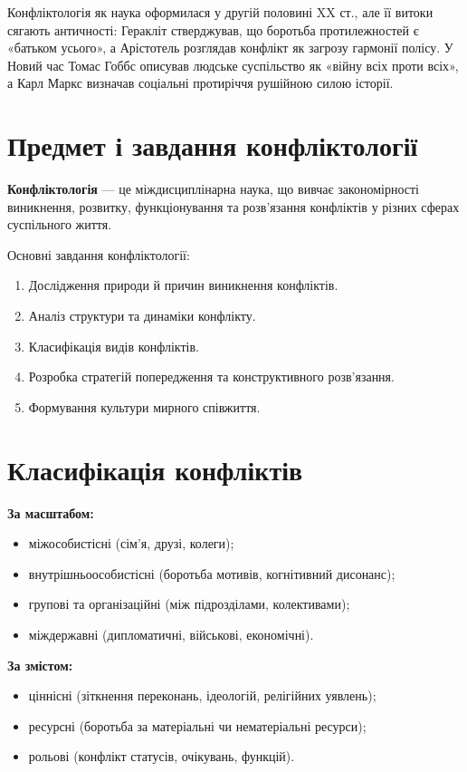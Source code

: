 \documentclass[12pt,a4paper]{article}
\begin{document}
    Конфліктологія як наука оформилася у другій половині XX ст., 
    але її витоки сягають античності: Геракліт стверджував, що боротьба протилежностей 
    є «батьком усього», а Арістотель розглядав конфлікт як загрозу гармонії полісу. 
    У Новий час Томас Гоббс описував людське суспільство як «війну всіх проти всіх», 
    а Карл Маркс визначав соціальні протиріччя рушійною силою історії.  

    \section*{Предмет і завдання конфліктології}
    \textbf{Конфліктологія} — це міждисциплінарна наука, що вивчає закономірності 
    виникнення, розвитку, функціонування та розв’язання конфліктів у різних сферах суспільного життя.

    Основні завдання конфліктології:
    \begin{enumerate}
        \item Дослідження природи й причин виникнення конфліктів.
        \item Аналіз структури та динаміки конфлікту.
        \item Класифікація видів конфліктів.
        \item Розробка стратегій попередження та конструктивного розв’язання.
        \item Формування культури мирного співжиття.
    \end{enumerate}

    \section*{Класифікація конфліктів}
    \textbf{За масштабом:}
    \begin{itemize}
        \item міжособистісні (сім’я, друзі, колеги);
        \item внутрішньоособистісні (боротьба мотивів, когнітивний дисонанс);
        \item групові та організаційні (між підрозділами, колективами);
        \item міждержавні (дипломатичні, військові, економічні).
    \end{itemize}

    \textbf{За змістом:}
    \begin{itemize}
        \item ціннісні (зіткнення переконань, ідеологій, релігійних уявлень);
        \item ресурсні (боротьба за матеріальні чи нематеріальні ресурси);
        \item рольові (конфлікт статусів, очікувань, функцій).
    \end{itemize}
\end{document}
